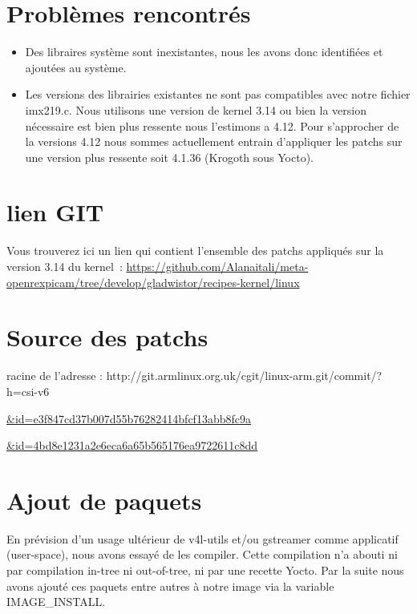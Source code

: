 \section{Problèmes rencontrés}
\begin{itemize}
    \item[] Des libraires système sont inexistantes, nous les avons donc identifiées et ajoutées au système.
    \item[] Les versions des librairies existantes ne sont pas compatibles avec notre fichier imx219.c.
    Nous utilisons une version de kernel 3.14 ou bien la version nécessaire est bien plus ressente nous
    l’estimons a 4.12. Pour s’approcher de la versions 4.12 nous sommes actuellement entrain d’appliquer
    les patchs sur une version plus ressente soit 4.1.36 (Krogoth sous Yocto).
\end{itemize}

\section{lien GIT}
Vous trouverez ici un lien qui contient l’ensemble des patchs appliqués sur la version 3.14 du kernel :
\href{https://github.com/Alanaitali/meta-openrexpicam/tree/develop/gladwistor/recipes-kernel/linux}
{https://github.com/Alanaitali/meta-openrexpicam/tree/develop/gladwistor/recipes-kernel/linux}

\section{Source des patchs}
racine de l'adresse : http://git.armlinux.org.uk/cgit/linux-arm.git/commit/?h=csi-v6

\href{http://git.armlinux.org.uk/cgit/linux-arm.git/commit/?h=csi-v6&id=e3f847cd37b007d55b76282414bfcf13abb8fc9a}
{\&id=e3f847cd37b007d55b76282414bfcf13abb8fc9a}

\href{http://git.armlinux.org.uk/cgit/linux-arm.git/commit/?h=csi-v6&id=4bd8e1231a2e6eca6a65b565176ea9722611c8dd}
{\&id=4bd8e1231a2e6eca6a65b565176ea9722611c8dd}

\section{Ajout de paquets}

En prévision d’un usage ultérieur de v4l-utils et/ou gstreamer comme applicatif
(user-space), nous avons essayé de les compiler. Cette compilation n’a abouti ni
par compilation in-tree ni out-of-tree, ni par une recette Yocto.
Par la suite nous avons ajouté ces paquets entre autres à notre image via la
variable IMAGE\_INSTALL.

